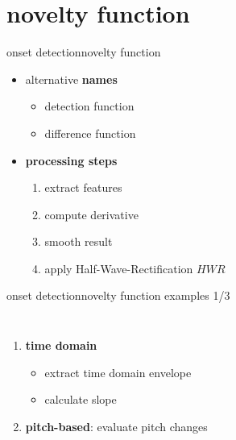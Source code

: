    \section{novelty function}
        \begin{frame}{onset detection}{novelty function}
            \begin{itemize}
                \item	alternative \textbf{names}
                    \begin{itemize}
                        \item	detection function
                        \item	difference function
                    \end{itemize}
                \bigskip
                \item<1->	\textbf{processing steps}
                    \begin{enumerate}
                        \item<2->	extract features
                        \item<3->	compute derivative
                        \item<4->	smooth result
                        \item<5->	apply Half-Wave-Rectification $HWR$
                    \end{enumerate}
            \end{itemize}
        \end{frame}
        \begin{frame}{onset detection}{novelty function examples 1/3}
            \vspace{-5mm}
            \begin{columns}
            \begin{enumerate}
                \item	\textbf{time domain}
                    \begin{itemize}
                        \item	extract time domain envelope
                        \item<1->	calculate slope
                    \end{itemize}
                \bigskip    
                \bigskip
                \item<2->	\textbf{pitch-based}: evaluate pitch changes
            \end{enumerate}
            \vspace{-5mm}
            \end{columns}
        \end{frame}
